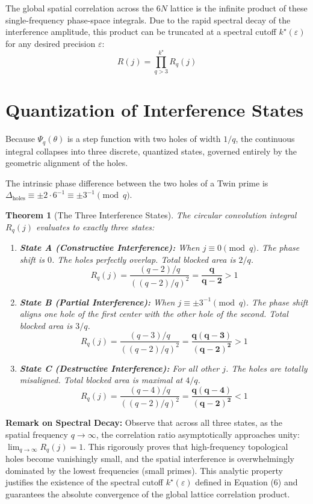 \documentclass[11pt,a4paper]{article}
\newtheorem{theorem}{Theorem}
\begin{document}
The global spatial correlation across the $6N$ lattice is the infinite product of these single-frequency phase-space integrals. Due to the rapid spectral decay of the interference amplitude, this product can be truncated at a spectral cutoff $k^\star(\varepsilon)$ for any desired precision $\varepsilon$:
\begin{equation}
R(j) = \prod_{q > 3}^{k^\star} R_q(j)
\end{equation}

\section{Quantization of Interference States}

Because $\Psi_q(\theta)$ is a step function with two holes of width $1/q$, the continuous integral collapses into three discrete, quantized states, governed entirely by the geometric alignment of the holes. 

The intrinsic phase difference between the two holes of a Twin prime is $\Delta_{\text{holes}} \equiv \pm 2 \cdot 6^{-1} \equiv \pm 3^{-1} \pmod q$.

\begin{theorem}[The Three Interference States]
The circular convolution integral $R_q(j)$ evaluates to exactly three states:
\begin{enumerate}
    \item \textbf{State A (Constructive Interference):} When $j \equiv 0 \pmod q$. The phase shift is $0$. The holes perfectly overlap. Total blocked area is $2/q$.
    $$ R_q(j) = \frac{(q-2)/q}{((q-2)/q)^2} = \mathbf{\frac{q}{q-2}} > 1 $$
    \item \textbf{State B (Partial Interference):} When $j \equiv \pm 3^{-1} \pmod q$. The phase shift aligns one hole of the first center with the other hole of the second. Total blocked area is $3/q$.
    $$ R_q(j) = \frac{(q-3)/q}{((q-2)/q)^2} = \mathbf{\frac{q(q-3)}{(q-2)^2}} > 1 $$
    \item \textbf{State C (Destructive Interference):} For all other $j$. The holes are totally misaligned. Total blocked area is maximal at $4/q$.
    $$ R_q(j) = \frac{(q-4)/q}{((q-2)/q)^2} = \mathbf{\frac{q(q-4)}{(q-2)^2}} < 1 $$
\end{enumerate}
\end{theorem}

\vspace{0.5em}
\noindent \textbf{Remark on Spectral Decay:} 
Observe that across all three states, as the spatial frequency $q \to \infty$, the correlation ratio asymptotically approaches unity: $\lim_{q \to \infty} R_q(j) = 1$. This rigorously proves that high-frequency topological holes become vanishingly small, and the spatial interference is overwhelmingly dominated by the lowest frequencies (small primes). This analytic property justifies the existence of the spectral cutoff $k^\star(\varepsilon)$ defined in Equation (6) and guarantees the absolute convergence of the global lattice correlation product.
\end{document}
